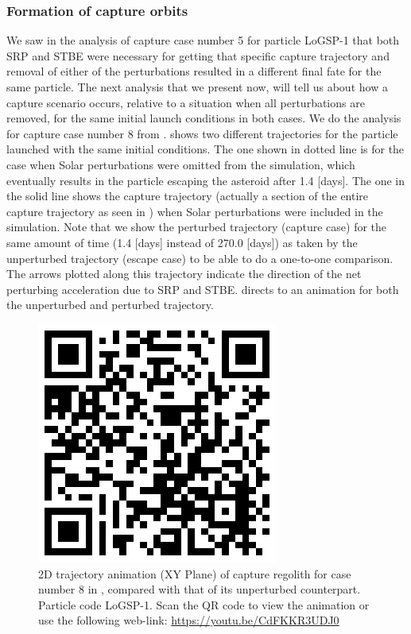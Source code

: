 \subsubsection{Formation of capture orbits}
We saw in the analysis of capture case number 5 for particle LoGSP-1 that both \gls{SRP} and \gls{STBE} were necessary for getting that specific capture trajectory and removal of either of the perturbations resulted in a different final fate for the same particle. The next analysis that we present now, will tell us about how a capture scenario occurs, relative to a situation when all perturbations are removed, for the same initial launch conditions in both cases. We do the analysis for capture case number 8 from .  shows two different trajectories for the particle launched with the same initial conditions. The one shown in dotted line is for the case when Solar perturbations were omitted from the simulation, which eventually results in the particle escaping the asteroid after 1.4 [days]. The one in the solid line shows the capture trajectory (actually a section of the entire capture trajectory as seen in ) when Solar perturbations were included in the simulation. Note that we show the perturbed trajectory (capture case) for the same amount of time (1.4 [days] instead of 270.0 [days]) as taken by the unperturbed trajectory (escape case) to be able to do a one-to-one comparison. The arrows plotted along this trajectory indicate the direction of the net perturbing acceleration due to \gls{SRP} and \gls{STBE}.  directs to an animation for both the unperturbed and perturbed trajectory.
\begin{figure}[htb]
\centering
\captionsetup{justification=centering}
\includegraphics[scale=0.25]{longest_edge_perturbations/3.2Density_1cmSize/qrcode_comparative_8ms_165Azimuth_45SolarPhase.png}
\caption{2D trajectory animation (XY Plane) of capture regolith for case number 8 in , compared with that of its unperturbed counterpart. Particle code LoGSP-1. Scan the QR code to view the animation or use the following web-link: \url{https://youtu.be/CdFKKR3UDJ0}}
\label{fig:LoGSP_1_capture_case_8_2d_trajectory_comparative_animation}
\end{figure}
